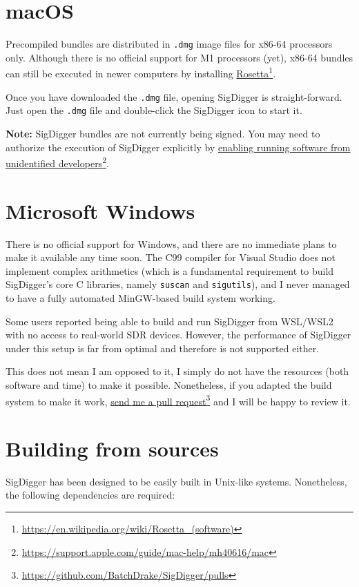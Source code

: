 \documentclass{ol-softwaremanual}
\newcommand{\doclink}[2]{\href{#1}{#2}\footnote{\url{#1}}}
\begin{document}
\section{macOS}
Precompiled bundles are distributed in \texttt{.dmg} image files for x86-64 processors only. Although there is no official support for M1 processors (yet), x86-64 bundles can still be executed in newer computers by installing \doclink{https://en.wikipedia.org/wiki/Rosetta_(software)}{Rosetta}.

Once you have downloaded the \texttt{.dmg} file, opening SigDigger is straight-forward. Just open the \texttt{.dmg} file and double-click the SigDigger icon to start it.

\begin{protip}
    \textbf{Note:} SigDigger bundles are not currently being signed. You may need to authorize the execution of SigDigger explicitly by \doclink{https://support.apple.com/guide/mac-help/mh40616/mac}{enabling running software from unidentified developers}.
\end{protip}
\section{Microsoft Windows}
There is no official support for Windows, and there are no immediate plans to make it available any time soon. The C99 compiler for Visual Studio does not implement complex arithmetics (which is a fundamental requirement to build SigDigger's core C libraries, namely \texttt{suscan} and \texttt{sigutils}), and I never managed to have a fully automated MinGW-based build system working.

Some users reported being able to build and run SigDigger from WSL/WSL2 with no access to real-world SDR devices. However, the performance of SigDigger under this setup is far from optimal and therefore is not supported either.

This does not mean I am opposed to it, I simply do not have the resources (both software and time) to make it possible. Nonetheless, if you adapted the build system to make it work, \doclink{https://github.com/BatchDrake/SigDigger/pulls}{send me a pull request} and I will be happy to review it.

\section{Building from sources}
SigDigger has been designed to be easily built in Unix-like systems. Nonetheless, the following dependencies are required:
\end{document}
